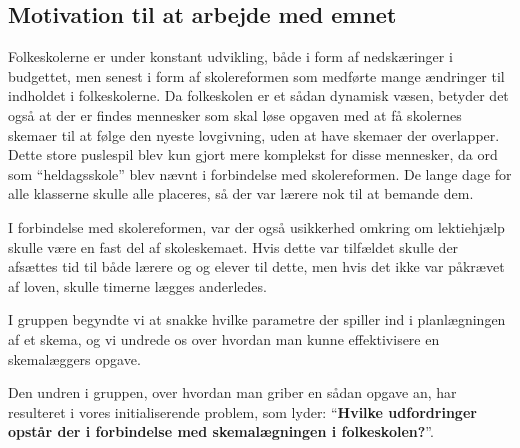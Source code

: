 \subsection{Motivation til at arbejde med emnet}
Folkeskolerne er under konstant udvikling, både i form af nedskæringer i budgettet, men senest i form af skolereformen som medførte mange ændringer til indholdet i folkeskolerne. Da folkeskolen er et sådan dynamisk væsen, betyder det også at der er findes mennesker som skal løse opgaven med at få skolernes skemaer til at følge den nyeste lovgivning, uden at have skemaer der overlapper. Dette store puslespil blev kun gjort mere komplekst for disse mennesker, da ord som ``heldagsskole'' blev nævnt i forbindelse med skolereformen. De lange dage for alle klasserne skulle alle placeres, så der var lærere nok til at bemande dem. 

I forbindelse med skolereformen, var der også usikkerhed omkring om lektiehjælp skulle være en fast del af skoleskemaet. Hvis dette var tilfældet skulle der afsættes tid til både lærere og og elever til dette, men hvis det ikke var påkrævet af loven, skulle timerne lægges anderledes. 

I gruppen begyndte vi at snakke hvilke parametre der spiller ind i planlægningen af et skema, og vi undrede os over hvordan man kunne effektivisere en skemalæggers opgave.

Den undren i gruppen, over hvordan man griber en sådan opgave an, har resulteret i vores initialiserende problem, som lyder: ``\textbf{Hvilke udfordringer opstår der i forbindelse med skemalægningen i folkeskolen?}''.